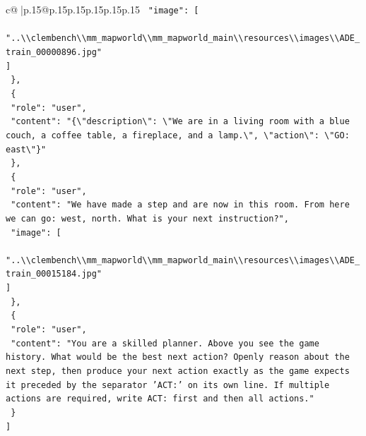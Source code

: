 \documentclass{article}
\begin{document}
{\begin{supertabular}{c@{$\;$}|p{.15\linewidth}@{}p{.15\linewidth}p{.15\linewidth}p{.15\linewidth}p{.15\linewidth}p{.15\linewidth}}
{{{\texttt{    "image": {[}} \\
\texttt{      "..\textbackslash{}\textbackslash{}clembench\textbackslash{}\textbackslash{}mm\_mapworld\textbackslash{}\textbackslash{}mm\_mapworld\_main\textbackslash{}\textbackslash{}resources\textbackslash{}\textbackslash{}images\textbackslash{}\textbackslash{}ADE\_train\_00000896.jpg"} \\
\texttt{    {]}} \\
\texttt{  \},} \\
\texttt{  \{} \\
\texttt{    "role": "user",} \\
\texttt{    "content": "\{\textbackslash{}"description\textbackslash{}": \textbackslash{}"We are in a living room with a blue couch, a coffee table, a fireplace, and a lamp.\textbackslash{}", \textbackslash{}"action\textbackslash{}": \textbackslash{}"GO: east\textbackslash{}"\}"} \\
\texttt{  \},} \\
\texttt{  \{} \\
\texttt{    "role": "user",} \\
\texttt{    "content": "We have made a step and are now in this room. From here we can go: west, north. What is your next instruction?",} \\
\texttt{    "image": {[}} \\
\texttt{      "..\textbackslash{}\textbackslash{}clembench\textbackslash{}\textbackslash{}mm\_mapworld\textbackslash{}\textbackslash{}mm\_mapworld\_main\textbackslash{}\textbackslash{}resources\textbackslash{}\textbackslash{}images\textbackslash{}\textbackslash{}ADE\_train\_00015184.jpg"} \\
\texttt{    {]}} \\
\texttt{  \},} \\
\texttt{  \{} \\
\texttt{    "role": "user",} \\
\texttt{    "content": "You are a skilled planner. Above you see the game history. What would be the best next action? Openly reason about the next step, then produce your next action exactly as the game expects it preceded by the separator 'ACT:' on its own line. If multiple actions are required, write ACT: first and then all actions."} \\
\texttt{  \}} \\
\texttt{{]}} \\
            }
        }
    }
     \\ \\


\end{supertabular}}
\end{document}
